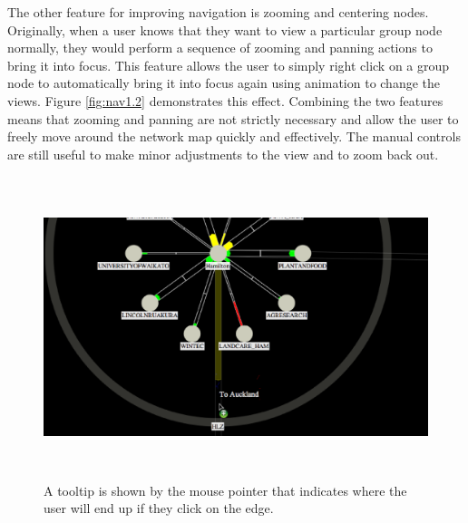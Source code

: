\documentclass[11pt, a4paper]{report}
\begin{document}
The other feature for improving navigation is zooming and centering nodes.
Originally, when a user knows that they want to view a particular group node
normally, they would perform a sequence of zooming and panning actions to bring
it into focus. This feature allows the user to simply right click on a group
node to automatically bring it into focus again using animation to change the
views. Figure \ref{fig:nav1.2} demonstrates this effect. Combining the two
features means that zooming and panning are not strictly necessary and allow the
user to freely move around the network map quickly and effectively. The manual
controls are still useful to make minor adjustments to the view and to zoom back
out.

\begin{figure}[h]
\centering
\includegraphics[width=170mm,height=88.01mm]{assets/nav1-1.eps}
\caption{A tooltip is shown by the mouse pointer that indicates where the user
will end up if they click on the edge.}
\label{fig:nav1.1}
\end{figure}
\end{document}
